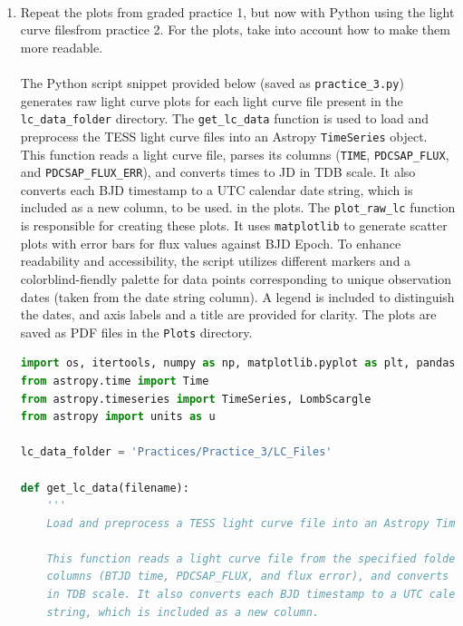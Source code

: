 \documentclass[a4paper,12pt]{article}
\title{\vspace{-25mm}{\normalsize\addfontfeatures{
  RawFeature={+cv08}}Semester I 2025}\\{
  \large\addfontfeatures{RawFeature={+cv08}}\medium{
  Astroinformatics I}}\\\LARGE\sbold{Graded Practice 3}}
\author{}
\date{\vspace{-22.5mm}}
\DeclareRobustCommand{\regular}{\fontseries{m}\selectfont}
\DeclareRobustCommand{\sbold}{\fontseries{sb}\selectfont}
\DeclareRobustCommand{\bold}{\fontseries{b}\selectfont}
\newcommand{\bcode}[1]{\texttt{\fontsize{11}{13}\selectfont\bold#1}}
\newenvironment{solution}{}{}
\begin{document}
\maketitle
\thispagestyle{fancy}
\sbold{\hspace{-6mm}José B. Batista M.\\}
\begin{enumerate}
  \item Repeat the plots from graded practice 1, but now with Python using the
  light curve filesfrom practice 2. For the plots, take into account how to make
  them more readable.
  \begin{solution}
    \\\\\regular The Python script snippet provided below (saved as
    \bcode{practice\_3.py}) generates raw light curve plots for each light curve
    file present in the \bcode{lc\_data\_folder} directory. The \bcode{get\_lc\_data}
    function is used to load and preprocess the TESS light curve files into an
    Astropy \bcode{TimeSeries} object. This function reads a light curve file,
    parses its columns (\bcode{TIME}, \bcode{PDCSAP\_FLUX}, and \bcode{PDCSAP\_FLUX\_ERR}),
    and converts times to JD in TDB scale. It also converts each BJD timestamp
    to a UTC calendar date string, which is included as a new column, to be used.
    in the plots. The \bcode{plot\_raw\_lc} function is responsible for creating
    these plots. It uses \bcode{matplotlib} to generate scatter plots with error
    bars for flux values against BJD Epoch. To enhance readability and accessibility,
    the script utilizes different markers and a colorblind-fiendly palette for
    data points corresponding to unique observation dates (taken from the date
    string column). A legend is included to distinguish the dates, and axis labels
    and a title are provided for clarity. The plots are saved as PDF files in the
    \bcode{Plots} directory.\\
\begin{lstlisting}[language=Python]
import os, itertools, numpy as np, matplotlib.pyplot as plt, pandas as pd
from astropy.time import Time
from astropy.timeseries import TimeSeries, LombScargle
from astropy import units as u

lc_data_folder = 'Practices/Practice_3/LC_Files'

def get_lc_data(filename):
    '''
    Load and preprocess a TESS light curve file into an Astropy TimeSeries object.
    
    This function reads a light curve file from the specified folder, parses its
    columns (BTJD time, PDCSAP_FLUX, and flux error), and converts times to JD
    in TDB scale. It also converts each BJD timestamp to a UTC calendar date
    string, which is included as a new column.
    

\end{lstlisting}
\end{solution}
\end{enumerate}
\end{document}
